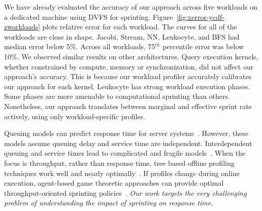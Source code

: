 \documentclass[twocolumn]{article}
\begin{document}
We have already evaluated the accuracy of our approach across five workloads on a dedicated machine using DVFS for sprinting. Figure~\ref{fig:xerror-ycdf-zworkloads} plots relative error for each workload. The curves for all of the workloads are close in shape. Jacobi, Stream, NN, Leukocyte, and BFS had median error below 5\%. Across all workloads, 75$^{th}$ percentile error was below 10\%.
We observed similar results on other architectures. Query execution kernels, whether constrained by compute, memory or synchronization, did not affect our approach's accuracy.  This is because our workload profiler accurately calibrates our approach for each kernel. Leukocyte has strong workload execution phases.  Some phases are more amenable to computational sprinting than others.  Nonetheless, our approach translates between marginal and effective sprint rate actively, using only workload-specific profiles.

Queuing models can predict response time for server systems~\cite{stewart2013zoolander}.
However, these models assume queuing delay and
service time are independent.  Interdependent queuing and service times lead to complicated and fragile models~\cite{Gardner:Sigmetric15:redundant,morris2016sprint}.
When the focus is throughput, rather than response time, tree based offline profiling techniques work well and nearly optimally~\cite{zhang2016pupil,mishra2017esp,kelley-icac-2015}. If profiles change during online execution, agent-based game theoretic approaches can provide optimal throughput-oriented sprinting policies~\cite{Fan:ASPLOS16:SprintGame,zahedi2017computational}.  {\em Our work targets the very challenging problem of understanding the impact of sprinting on response time.}






\end{document}

